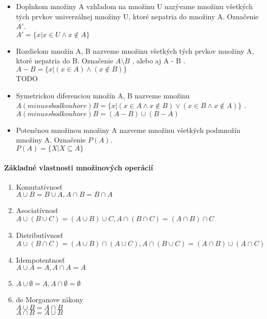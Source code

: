 \begin{itemize}
    \item Doplnkom množiny A vzhľadom na množinu U nazývame množinu všetkých tých prvkov univerzálnej množiny U, ktoré nepatria do množiny A. Označenie $A'$. \\
    $A' = \{ x | x \in U \wedge x \notin A\} $\\

    \item Rozdielom množín A, B nazveme množinu všetkých tých prvkov množiny A, ktoré nepatria do B. Označenie $A \setminus B$ , alebo aj A - B .\\
    $A - B = \{ x | ( x \in A ) \wedge ( x \notin B )\}$\\
    TODO
    \item Symetrickou diferenciou množín A, B nazveme množinu 
   $ A (minus s bodkou hore) B = \{ x | (x \in A \wedge x \notin B) \vee (x \in B \wedge x \notin A) \}$ .\\
    $A (minus s bodkou hore) B = ( A - B) \cup ( B - A)$\\

    \item Potenčnou množinou množiny A nazveme množinu všetkých podmnožín množiny A. Označenie $P (A) $.\\
    $P (A) = \{ X | X \subseteq A \}$\\
  \end{itemize}

  \paragraph{Základné vlastnosti množinových operácií}
  	\begin{enumerate}
  		\item Komutatívnosť \\
		$A \cup B = B \cup A , A \cap B = B \cap A$
		\item Asociatívnosť \\
		$A \cup ( B \cup C) = ( A \cup B) \cup C , A \cap ( B \cap C) = ( A \cap B) \cap C $
		\item Distributívnosť \\
		$A \cup ( B \cap C) = ( A \cup B ) \cap ( A \cup C ) , A \cap ( B \cup C ) = ( A \cap B) \cup ( A \cap C ) $
		\item Idempotentnosť \\
		$ A \cup A = A, A \cap A = A $
		\item $ A \cup \emptyset = A , A\cap \emptyset = \emptyset $
		\item de Morganove zákony \\
		$ A \cup B = A \cap B $ \\
		$ A \cap B = A \cup B $
  	\end{enumerate}
  
